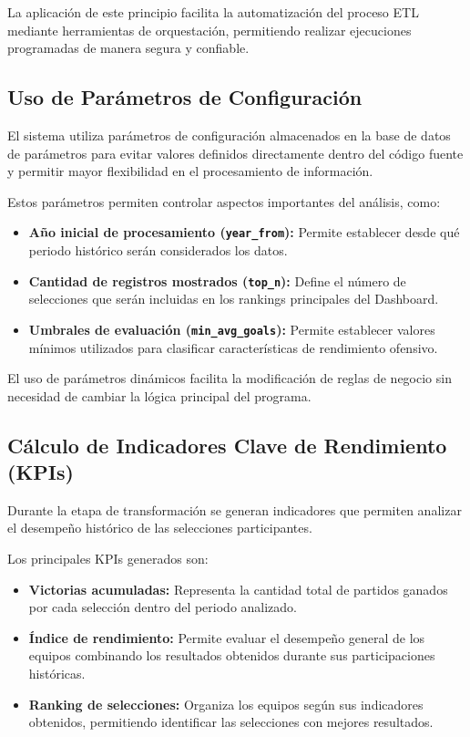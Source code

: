 \documentclass[
  letterpaper,
  DIV=11,
  numbers=noendperiod]{scrartcl}
\begin{document}
La aplicación de este principio facilita la automatización del proceso
ETL mediante herramientas de orquestación, permitiendo realizar
ejecuciones programadas de manera segura y confiable.

\subsection{Uso de Parámetros de
Configuración}\label{uso-de-paruxe1metros-de-configuraciuxf3n}

El sistema utiliza parámetros de configuración almacenados en la base de
datos de parámetros para evitar valores definidos directamente dentro
del código fuente y permitir mayor flexibilidad en el procesamiento de
información.

Estos parámetros permiten controlar aspectos importantes del análisis,
como:

\begin{itemize}
\item
  \textbf{Año inicial de procesamiento (\texttt{year\_from}):} Permite
  establecer desde qué periodo histórico serán considerados los datos.
\item
  \textbf{Cantidad de registros mostrados (\texttt{top\_n}):} Define el
  número de selecciones que serán incluidas en los rankings principales
  del Dashboard.
\item
  \textbf{Umbrales de evaluación (\texttt{min\_avg\_goals}):} Permite
  establecer valores mínimos utilizados para clasificar características
  de rendimiento ofensivo.
\end{itemize}

El uso de parámetros dinámicos facilita la modificación de reglas de
negocio sin necesidad de cambiar la lógica principal del programa.

\subsection{Cálculo de Indicadores Clave de Rendimiento
(KPIs)}\label{cuxe1lculo-de-indicadores-clave-de-rendimiento-kpis}

Durante la etapa de transformación se generan indicadores que permiten
analizar el desempeño histórico de las selecciones participantes.

Los principales KPIs generados son:

\begin{itemize}
\item
  \textbf{Victorias acumuladas:} Representa la cantidad total de
  partidos ganados por cada selección dentro del periodo analizado.
\item
  \textbf{Índice de rendimiento:} Permite evaluar el desempeño general
  de los equipos combinando los resultados obtenidos durante sus
  participaciones históricas.
\item
  \textbf{Ranking de selecciones:} Organiza los equipos según sus
  indicadores obtenidos, permitiendo identificar las selecciones con
  mejores resultados.
\end{itemize}
\end{document}
